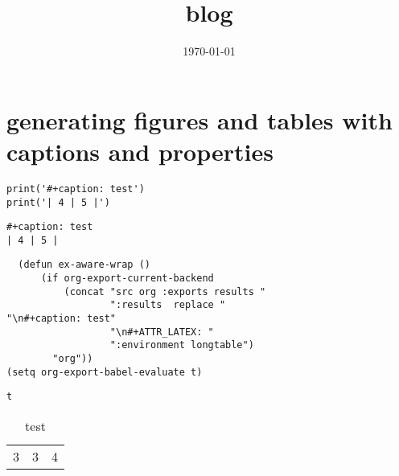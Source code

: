 \documentclass[11pt]{article}
\date{\today}
\title{blog}
\begin{document}
\section{generating figures and tables with captions and properties}
\label{sec-1}

\begin{verbatim}
print('#+caption: test')
print('| 4 | 5 |')
\end{verbatim}

\begin{verbatim}
#+caption: test
| 4 | 5 |
\end{verbatim}

\begin{verbatim}
  (defun ex-aware-wrap ()
      (if org-export-current-backend
          (concat "src org :exports results "
                  ":results  replace "
"\n#+caption: test"
                  "\n#+ATTR_LATEX: "
                  ":environment longtable")
        "org"))
(setq org-export-babel-evaluate t)
\end{verbatim}

\begin{verbatim}
t
\end{verbatim}

\begin{longtable}{rrr}
\caption{test}
\\
3 & 3 & 4\\
\end{longtable}
\end{document}
